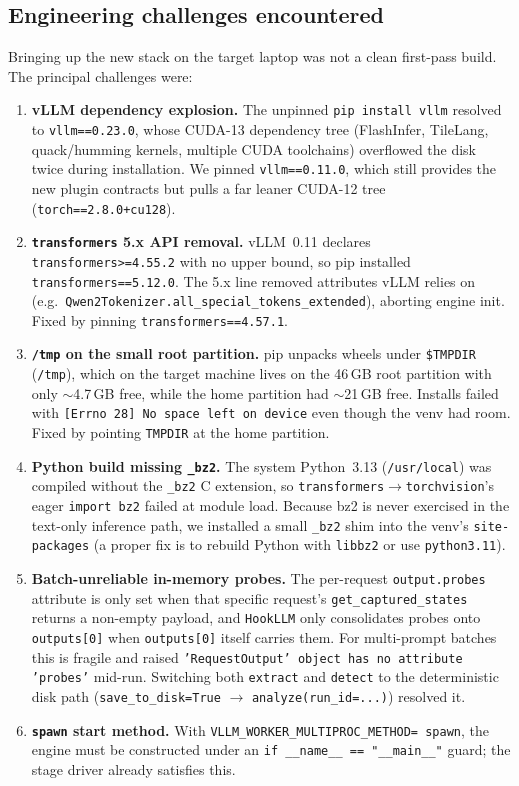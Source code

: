 \documentclass[11pt]{article}
\begin{document}
\subsection{Engineering challenges encountered}\label{sec:challenges}
Bringing up the new stack on the target laptop was not a clean first-pass build. The principal
challenges were:
\begin{enumerate}
  \item \textbf{vLLM dependency explosion.} The unpinned \texttt{pip install vllm} resolved to
  \texttt{vllm==0.23.0}, whose CUDA-13 dependency tree (FlashInfer, TileLang, quack/humming
  kernels, multiple CUDA toolchains) overflowed the disk twice during installation. We pinned
  \texttt{vllm==0.11.0}, which still provides the new plugin contracts but pulls a far leaner
  CUDA-12 tree (\texttt{torch==2.8.0+cu128}).
  \item \textbf{\texttt{transformers} 5.x API removal.} vLLM~0.11 declares
  \texttt{transformers>=4.55.2} with no upper bound, so pip installed
  \texttt{transformers==5.12.0}. The 5.x line removed attributes vLLM relies on (e.g.\
  \texttt{Qwen2Tokenizer.all\_special\_tokens\_extended}), aborting engine init. Fixed by
  pinning \texttt{transformers==4.57.1}.
  \item \textbf{\texttt{/tmp} on the small root partition.} pip unpacks wheels under
  \texttt{\$TMPDIR} (\texttt{/tmp}), which on the target machine lives on the 46\,GB root
  partition with only $\sim$4.7\,GB free, while the home partition had $\sim$21\,GB free.
  Installs failed with \texttt{[Errno 28] No space left on device} even though the venv had
  room. Fixed by pointing \texttt{TMPDIR} at the home partition.
  \item \textbf{Python build missing \texttt{\_bz2}.} The system Python~3.13
  (\texttt{/usr/local}) was compiled without the \texttt{\_bz2} C extension, so
  \texttt{transformers}$\rightarrow$\texttt{torchvision}'s eager \texttt{import bz2} failed at
  module load. Because bz2 is never exercised in the text-only inference path, we installed a
  small \texttt{\_bz2} shim into the venv's \texttt{site-packages} (a proper fix is to rebuild
  Python with \texttt{libbz2} or use \texttt{python3.11}).
  \item \textbf{Batch-unreliable in-memory probes.} The per-request \texttt{output.probes}
  attribute is only set when that specific request's \texttt{get\_captured\_states} returns a
  non-empty payload, and \texttt{HookLLM} only consolidates probes onto \texttt{outputs[0]}
  when \texttt{outputs[0]} itself carries them. For multi-prompt batches this is fragile and
  raised \texttt{'RequestOutput' object has no attribute 'probes'} mid-run. Switching both
  \texttt{extract} and \texttt{detect} to the deterministic disk path
  (\texttt{save\_to\_disk=True} $\rightarrow$ \texttt{analyze(run\_id=...)}) resolved it.
  \item \textbf{\texttt{spawn} start method.} With \texttt{VLLM\_WORKER\_MULTIPROC\_METHOD=
  spawn}, the engine must be constructed under an \texttt{if \_\_name\_\_ == "\_\_main\_\_"}
  guard; the stage driver already satisfies this.
\end{enumerate}
\end{document}
